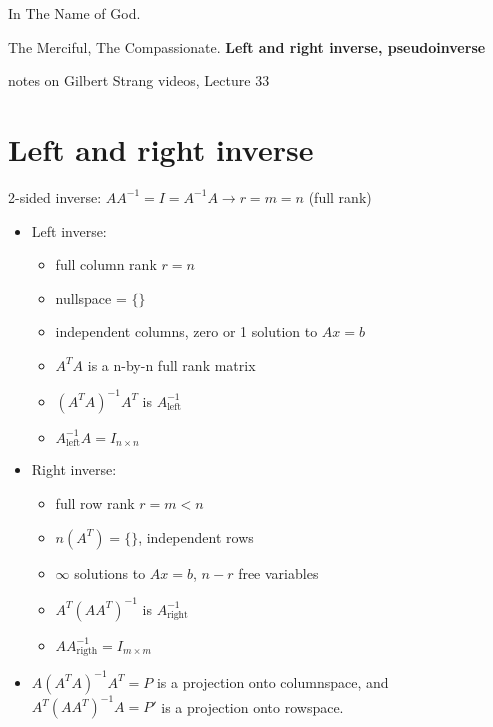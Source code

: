 \documentclass[a4paper,12pt]{article}
\theoremstyle{definition} \newtheorem{Theorem}{Theorem}
\begin{document}
\begin{center}
In The Name of God.

The Merciful, The Compassionate.
\vskip 1cm
{\Large\bfseries{Left and right inverse, pseudoinverse}}

\vskip 0.2cm
\tiny{notes on Gilbert Strang videos, Lecture 33}

\end{center}

\section{Left and right inverse}
2-sided inverse: $A A^{-1} = I = A^{-1} A \longrightarrow r=m=n$ (full rank)
\begin{itemize}
\item Left inverse:
\begin{itemize}
\item full column rank $r=n$
\item nullspace = $\{ \}$
\item independent columns, zero or 1 solution to $Ax=b$
\item $A^T A$ is a n-by-n full rank matrix
\item $(A^T A)^{-1} A^T$ is $A^{-1}_{\text{left}}$
\item $A^{-1}_{\text{left}} A = I_{n \times n}$
\end{itemize}
\item Right inverse:
\begin{itemize}
\item full row rank $r=m < n$ 
\item $n(A^T)=\{ \}$, independent rows
\item $\infty$ solutions to $Ax=b$, $n-r$ free variables
\item $A^T (A A^T)^{-1}$ is $A^{-1}_{\text{right}}$
\item $A A^{-1}_{\text{rigth}} = I_{m \times m}$
\end{itemize}
\item $A (A^T A)^{-1} A^T = P$ is a projection onto columnspace,
 and $A^T (A A^T)^{-1} A = P'$ is a projection onto rowspace.
\end{itemize}
\end{document}
